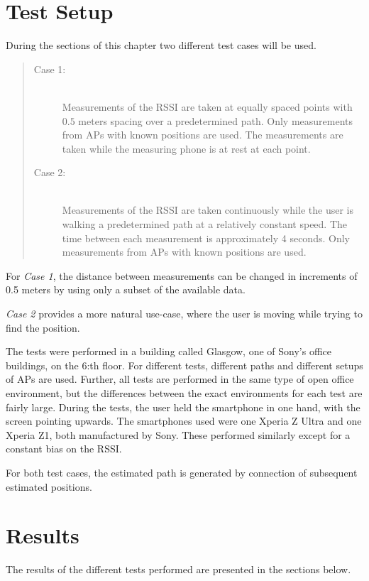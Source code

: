 \documentclass{LTHthesis}
\begin{document}
%
\section{Test Setup}
\label{sec:test_setup}
%
During the sections of this chapter two different test cases will be used.
\begin{quote}
%
\begin{description}
%
\item[Case 1:] \hfill \\
%
Measurements of the RSSI are taken at equally spaced points with $0.5$ meters spacing over a predetermined path. Only measurements from APs with known positions are used. The measurements are taken while the measuring phone is at rest at each point.  
%
\vspace{5pt}
%
\item[Case 2:] \hfill \\
%
Measurements of the RSSI are taken continuously while the user is walking a predetermined path at a relatively constant speed. The time between each measurement is approximately 4 seconds. Only measurements from APs with known positions are used.  
%
\end{description}

\end{quote}
%
For \emph{Case 1}, the distance between measurements can be changed in increments of 0.5 meters by using only a subset of the available data. 

\emph{Case 2} provides a more natural use-case, where the user is moving while trying to find the position.

The tests were performed in a building called Glasgow, one of Sony's office buildings, on the 6:th floor. For different tests, different paths and different setups of APs are used. Further, all tests are performed in the same type of open office environment, but the differences between the exact environments for each test are fairly large. During the tests, the user held the smartphone in one hand, with the screen pointing upwards. The smartphones used were one Xperia Z Ultra and one Xperia Z1, both manufactured by Sony. These performed similarly except for a constant bias on the RSSI.

For both test cases, the estimated path is generated by connection of subsequent estimated positions. 
%
\section{Results}
\label{environment_results}
%
The results of the different tests performed are presented in the sections below. 
%
\end{document}
